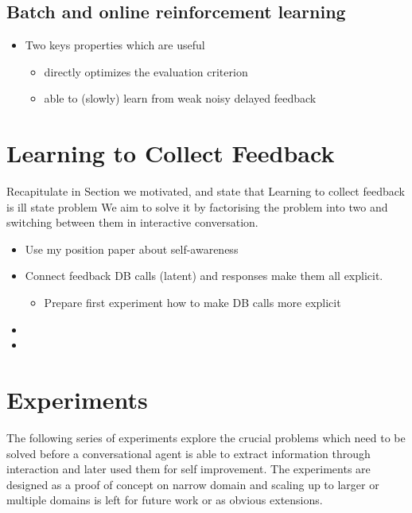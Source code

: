 \documentclass[11pt]{article}
\begin{document}
\subsection{Batch and online reinforcement learning}
\label{sub:rl}
\begin{itemize}
    \item Two keys properties which are useful
        \begin{itemize}
            \item directly optimizes the evaluation criterion
            \item able to (slowly) learn from weak noisy delayed feedback
        \end{itemize}
\end{itemize}


\section{Learning to Collect Feedback}
\label{sec:learn_feedback}
Recapitulate in Section we motivated, and state that Learning to collect feedback is ill state problem
We aim to solve it by factorising the problem into two and switching between them in interactive conversation.

\begin{itemize}
    \item Use my position paper about self-awareness
    \item Connect feedback DB calls (latent) and responses make them all explicit.
        \begin{itemize}
            \item Prepare first experiment how to make DB calls more explicit
        \end{itemize}
    \item 
    \item 
\end{itemize}

\section{Experiments}
\label{sec:experiments}
The following series of experiments explore the crucial problems which need to be solved before a conversational agent is able to extract information through interaction and later used them for self improvement.
The experiments are designed as a proof of concept on narrow domain and scaling up to larger or multiple domains is left for future work or as obvious extensions. 
\end{document}
